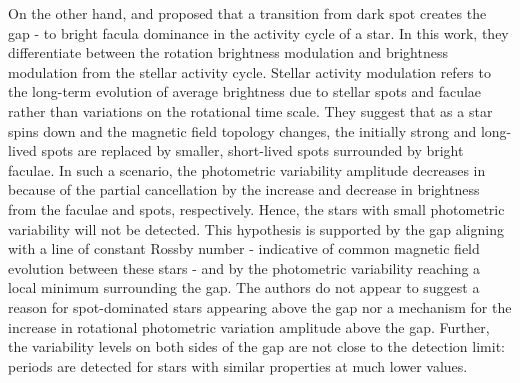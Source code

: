 On the other hand, \citet{reinhold_transition_2019} and \citet{reinhold_stellar_2020} proposed that a transition from dark spot creates the gap - to bright facula dominance in the activity cycle of a star.
In this work, they differentiate between the rotation brightness modulation and brightness modulation from the stellar activity cycle.
Stellar activity modulation refers to the long-term evolution of average brightness due to stellar spots and faculae rather than variations on the rotational time scale.
They suggest that as a star spins down and the magnetic field topology changes, the initially strong and long-lived spots are replaced by smaller, short-lived spots surrounded by bright faculae.
In such a scenario, the photometric variability amplitude decreases in because of the partial cancellation by the increase and decrease in brightness from the faculae and spots, respectively.
Hence, the stars with small photometric variability will not be detected.
This hypothesis is supported by the gap aligning with a line of constant Rossby number - indicative of common magnetic field evolution between these stars - and by the photometric variability reaching a local minimum surrounding the gap.
The authors do not appear to suggest a reason for spot-dominated stars appearing above the gap nor a mechanism for the increase in rotational photometric variation amplitude above the gap.
Further, the variability levels on both sides of the gap are not close to the detection limit: periods are detected for stars with similar properties at much lower \rper{} values.

